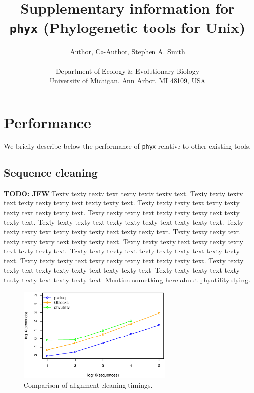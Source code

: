 \documentclass{article}
\begin{document}
\title{Supplementary information for \texttt{phyx} (Phylogenetic tools for Unix)}

\author{Author, Co-Author, Stephen A. Smith\\\\
\normalsize{Department of Ecology \& Evolutionary Biology}\\
\normalsize{University of Michigan, Ann Arbor, MI 48109, USA}}
\date{} %
\maketitle

\section{Performance}
We briefly describe below the performance of \texttt{phyx} relative to other
existing tools.

\subsection{Sequence cleaning}
\textbf{TODO: JFW} Texty texty texty text texty texty texty text.
Texty texty texty text texty texty texty text texty texty text.
Texty texty texty text texty texty texty text texty texty text.
Texty texty texty text texty texty texty text texty texty text.
Texty texty texty text texty texty texty text texty texty text.
Texty texty texty text texty texty texty text texty texty text.
Texty texty texty text texty texty texty text texty texty text.
Texty texty texty text texty texty texty text texty texty text.
Texty texty texty text texty texty texty text texty texty text.
Texty texty texty text texty texty texty text texty texty text.
Texty texty texty text texty texty texty text texty texty text.
Texty texty texty text texty texty texty text texty texty text.
Mention something here about phyutility \cite{SmithDunn2008} dying.

\begin{figure}[!h]
    \centering
    \includegraphics[width=3.0in]{clsq}
    \caption{Comparison of alignment cleaning timings.}
    \label{cleaningfigure}
\label{fig:S1}
\end{figure}
\end{document}
